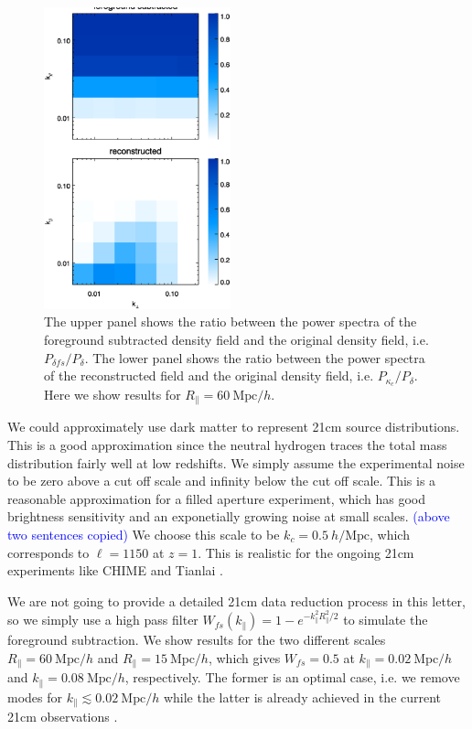 \documentclass[aps,prl,twocolumn,showpacs,superscriptaddress,groupedaddress,nofootinbib]{revtex4}  %
\newcommand{\mr}{\mathrm}
\newcommand{\tcb}{\textcolor{blue}}
\begin{document}
\begin{figure}[tbp]
\begin{center}
\includegraphics[width=0.48\textwidth]{1.000ratio2d_fswf.eps}
\end{center}
\vspace{-0.7cm}
\caption{The upper panel shows the ratio between the power spectra of the 
foreground subtracted density field and the original density field, i.e. 
$P_{\delta{fs}}/P_\delta$. 
The lower panel shows the ratio between the power spectra of the reconstructed 
field and the original density field, i.e. $P_{\kappa_c}/P_\delta$.
Here we show results for $R_\parallel=60\ \mr{Mpc}/h$.}
\label{fig:ratio}
\end{figure}

We could approximately use dark matter to represent 21cm source distributions.
This is a good approximation since the neutral hydrogen traces the total mass
distribution fairly well at low redshifts. We simply assume the experimental
noise to be zero above a cut off scale and infinity below the cut off scale.
This is a reasonable approximation for a filled aperture experiment, which
has good brightness sensitivity and an exponetially growing noise at small 
scales. \tcb{(above two sentences copied)}
We choose this scale to be $k_c=0.5\ h/\mr{Mpc}$, which corresponds
to $\ell=1150$ at $z=1$. This is realistic for the ongoing 21cm experiments like
CHIME \cite{2014SPIE.9145E..22B}\cite{2014SPIE.9145E..4VN}
and Tianlai \cite{2012IJMPS..12..256C}\cite{2015ApJ...798...40X}.

We are not going to provide a detailed 21cm data reduction process in this 
letter, so we simply  use a high pass filter 
$W_{fs}(k_\parallel)=1-e^{-k_\parallel^2R_\parallel^2/2}$ to simulate the 
foreground subtraction. We show results for the two different scales 
$R_\parallel=60\ \mr{Mpc}/h$ and $R_\parallel=15\ \mr{Mpc}/h$, which gives
$W_{fs}=0.5$ at $k_\parallel=0.02\ \mr{Mpc}/h$ and 
$k_\parallel=0.08\ \mr{Mpc}/h$, respectively. The former is an optimal case, 
i.e. we remove modes for $k_\parallel\lesssim0.02\ \mr{Mpc}/h$ while the latter
is already achieved in the current 21cm observations 
\cite{2013ApJ...763L..20M}\cite{2013MNRAS.434L..46S}.
\end{document}
